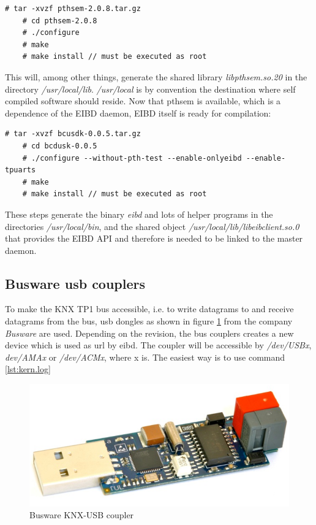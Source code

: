 \begin{lstlisting}[style=BashInputStyle]
    # tar -xvzf pthsem-2.0.8.tar.gz
    # cd pthsem-2.0.8
    # ./configure
    # make
    # make install // must be executed as root
\end{lstlisting}

This will, among other things, generate the shared library \textit{libpthsem.so.20} in the directory \textit{/usr/local/lib}. \textit{/usr/local}
 is by convention the destination where self compiled software should reside.
Now that pthsem is available, which is a dependence of the EIBD daemon, EIBD itself is ready for compilation:

\begin{lstlisting}[style=BashInputStyle]
    # tar -xvzf bcusdk-0.0.5.tar.gz
    # cd bcdusk-0.0.5
    # ./configure --without-pth-test --enable-onlyeibd --enable-tpuarts
    # make
    # make install // must be executed as root
\end{lstlisting}

These steps generate the binary \textit{eibd} and lots of helper programs in the directories \textit{/usr/local/bin}, and the shared object
\textit{/usr/local/lib/libeibclient.so.0} that provides the EIBD API and therefore is needed to be linked to the master daemon. 

\subsection{Busware \gls{usb} couplers}

To make the KNX TP1 bus accessible, i.e. to write datagrams to and receive datagrams from the bus, \gls{usb} dongles as shown in figure \ref{fig:busware}
from the company \textit{Busware} are used. Depending on the revision, the bus couplers creates a new device which is used as \gls{url} by \gls{eibd}.
The coupler will be accessible by \textit{/dev/USBx}, \textit{dev/AMAx} or \textit{/dev/ACMx}, where x is. The easiest way is to use command \ref{lst:kern.log}

\begin{figure}
    \centering
    \caption{Busware KNX-USB coupler}
    \label{fig:busware}
\includegraphics[scale=0.2]{figures/busware.png}
\end{figure}


